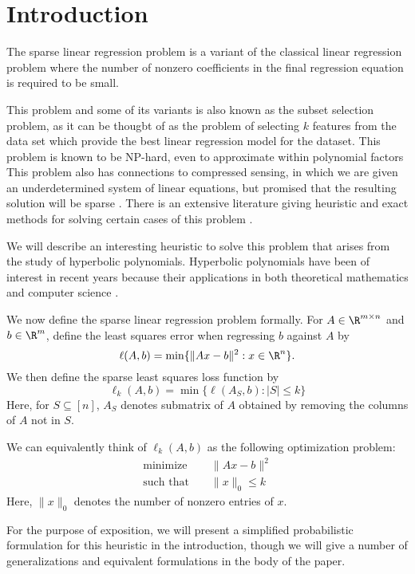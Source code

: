 \section{Introduction}
The sparse linear regression problem is a variant of the classical linear regression problem where the number of nonzero coefficients in the final regression equation is required to be small.\cite{TODO}

This problem and some of its variants is also known as the subset selection problem, \cite{TODO, https://www.pnas.org/doi/10.1073/pnas.2014241117} as it can be thougbt of as the problem of selecting $k$ features from the data set which provide the best linear regression model for the dataset.
This problem is known to be NP-hard, even to approximate within polynomial factors \cite{TODO}
This problem also has connections to compressed sensing, in which we are given an underdetermined system of linear equations, but promised that the resulting solution will be sparse  \cite{TODO}.
There is an extensive literature giving heuristic and exact methods for solving certain cases of this problem \cite{TODO}.

We will describe an interesting heuristic to solve this problem that arises from the study of hyperbolic polynomials. Hyperbolic polynomials have been of interest in recent years because their applications in both theoretical mathematics and computer science \cite{}. %

We now define the sparse linear regression problem formally.
For $A \in \R^{m\times n}$ and $b \in \R^{m}$, define the least squares error when regressing $b$ against $A$ by
\[
    \ell(A, b) = \min \{\|Ax - b\|^2 : x \in \R^n\}.
\]
We then define the sparse least squares loss function by
\[
    \ell_k(A,b) = \min \{\ell(A_S, b) : |S| \le k\}
\]
Here, for $S \subseteq [n]$, $A_S$ denotes submatrix of $A$ obtained by removing the columns of $A$ not in $S$.

We can equivalently think of $\ell_k(A, b)$ as the following optimization problem:
\begin{equation*}
\begin{aligned}
    \text{minimize} &&\|Ax-b\|^2\\
    \text{such that } &&\|x\|_0 \le k
\end{aligned}
\end{equation*}
Here, $\|x\|_0$ denotes the number of nonzero entries of $x$. 

For the purpose of exposition, we will present a simplified probabilistic formulation for this heuristic in the introduction, though we will give a number of generalizations and equivalent formulations in the body of the paper.

